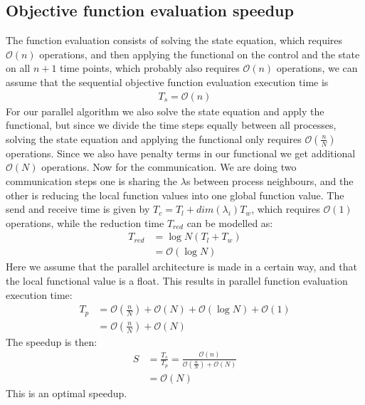 \subsection{Objective function evaluation speedup}
The function evaluation consists of solving the state equation, which requires $\mathcal{O}(n)$ operations, and then applying the functional on the control and the state on all $n+1$ time points, which probably also requires $\mathcal{O}(n)$ operations, we can assume that the sequential objective function evaluation execution time is 
\begin{align*}
T_s = \mathcal{O}(n)
\end{align*}
For our parallel algorithm we also solve the state equation and apply the functional, but since we divide the time steps equally between all processes, solving the state equation and applying the functional only requires $\mathcal{O}(\frac{n}{N})$ operations. Since we also have penalty terms in our functional we get additional $\mathcal{O}(N)$ operations. Now for the communication. We are doing two communication steps one is sharing the $\lambda$s between process neighbours, and the other is reducing the local function values into one global function value. The send and receive time is given by $T_c = T_l + \textit{dim}(\lambda_i)T_w$, which requires $\mathcal{O}(1)$ operations, while the reduction time $T_{red}$ can be modelled as:
\begin{align*}
T_{red} &= \log N (T_l+T_w) \\
&= \mathcal{O}(\log N)
\end{align*} 
Here we assume that the parallel architecture is made in a certain way, and that the local functional value is a float. This results in parallel function evaluation execution time:
\begin{align*}
T_p &= \mathcal{O}(\frac{n}{N}) +\mathcal{O}(N) + \mathcal{O}(\log N) +\mathcal{O} (1) \\
&=\mathcal{O}(\frac{n}{N}) +\mathcal{O}(N)
\end{align*}
The speedup is then:
\begin{align*}
S &= \frac{T_s}{T_p} = \frac{\mathcal{O}(n)}{\mathcal{O}(\frac{n}{N}) +\mathcal{O}(N)} \\
&=\mathcal{O}(N)
\end{align*}
This is an optimal speedup.
